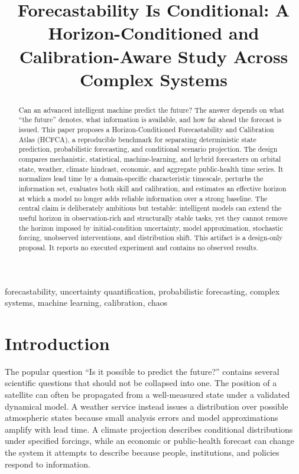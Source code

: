 \documentclass[conference]{IEEEtran}
\title{Forecastability Is Conditional: A Horizon-Conditioned and Calibration-Aware Study Across Complex Systems}
\author{\IEEEauthorblockN{Anonymous Proposal Author}\IEEEauthorblockA{Design-only research plan generated through the Survey--Idea--ExperimentDesign--Author workflow}}
\begin{document}
\maketitle

\begin{abstract}
Can an advanced intelligent machine predict the future? The answer depends on what ``the future'' denotes, what information is available, and how far ahead the forecast is issued. This paper proposes a Horizon-Conditioned Forecastability and Calibration Atlas (HCFCA), a reproducible benchmark for separating deterministic state prediction, probabilistic forecasting, and conditional scenario projection. The design compares mechanistic, statistical, machine-learning, and hybrid forecasters on orbital state, weather, climate hindcast, economic, and aggregate public-health time series. It normalizes lead time by a domain-specific characteristic timescale, perturbs the information set, evaluates both skill and calibration, and estimates an effective horizon at which a model no longer adds reliable information over a strong baseline. The central claim is deliberately ambitious but testable: intelligent models can extend the useful horizon in observation-rich and structurally stable tasks, yet they cannot remove the horizon imposed by initial-condition uncertainty, model approximation, stochastic forcing, unobserved interventions, and distribution shift. This artifact is a design-only proposal. It reports no executed experiment and contains no observed results.
\end{abstract}

\begin{IEEEkeywords}
forecastability, uncertainty quantification, probabilistic forecasting, complex systems, machine learning, calibration, chaos
\end{IEEEkeywords}

\section{Introduction}
The popular question ``Is it possible to predict the future?'' contains several scientific questions that should not be collapsed into one. The position of a satellite can often be propagated from a well-measured state under a validated dynamical model. A weather service instead issues a distribution over possible atmospheric states because small analysis errors and model approximations amplify with lead time. A climate projection describes conditional distributions under specified forcings, while an economic or public-health forecast can change the system it attempts to describe because people, institutions, and policies respond to information.
\end{document}
